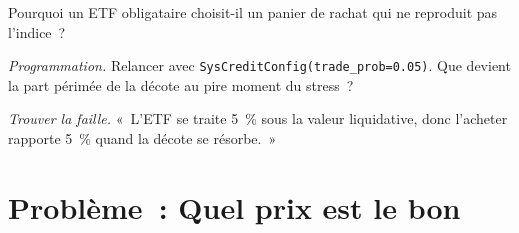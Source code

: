 \begin{exercise}[$\star\star$]\label{exo:s2:systematic-credit-and-bond-etf-arbitrage:6}
Pourquoi un ETF obligataire choisit-il un panier de rachat qui ne reproduit pas l'indice~?
\end{exercise}

\begin{exercise}[$\star\star\star$]\label{exo:s2:systematic-credit-and-bond-etf-arbitrage:7}
\emph{Programmation.} Relancer avec \texttt{SysCreditConfig(trade\_prob=0.05)}. Que devient la part périmée de la décote au pire moment du stress~?
\end{exercise}

\begin{exercise}[$\star\star\star$]\label{exo:s2:systematic-credit-and-bond-etf-arbitrage:8}
\emph{Trouver la faille.} «~L'ETF se traite 5~\% sous la valeur liquidative, donc l'acheter rapporte 5~\% quand la décote se résorbe.~»
\end{exercise}

\section{Problème~: Quel prix est le bon}

